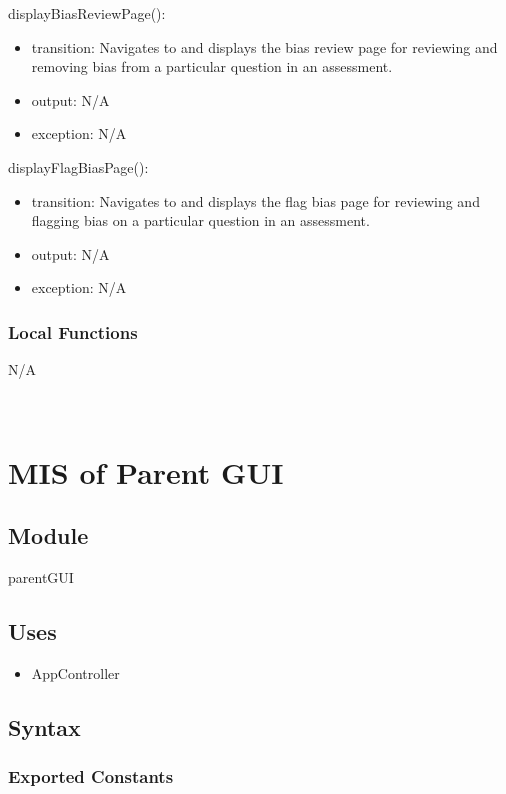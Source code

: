\documentclass[12pt, titlepage]{article}
\begin{document}
\noindent displayBiasReviewPage():
\begin{itemize}
\item transition: Navigates to and displays the bias review page for reviewing and removing bias from a particular question in an assessment.
\item output: N/A
\item exception: N/A
\end{itemize}

\noindent displayFlagBiasPage():
\begin{itemize}
\item transition: Navigates to and displays the flag bias page for reviewing and flagging bias on a particular question in an assessment.
\item output: N/A
\item exception: N/A
\end{itemize}

\subsubsection{Local Functions}
N/A

~\newpage
\section{MIS of Parent GUI \label{mParentGUI} }

\subsection{Module}

parentGUI

\subsection{Uses}

\begin{itemize}
  \item AppController
\end{itemize}

\subsection{Syntax}

\subsubsection{Exported Constants}
\end{document}
